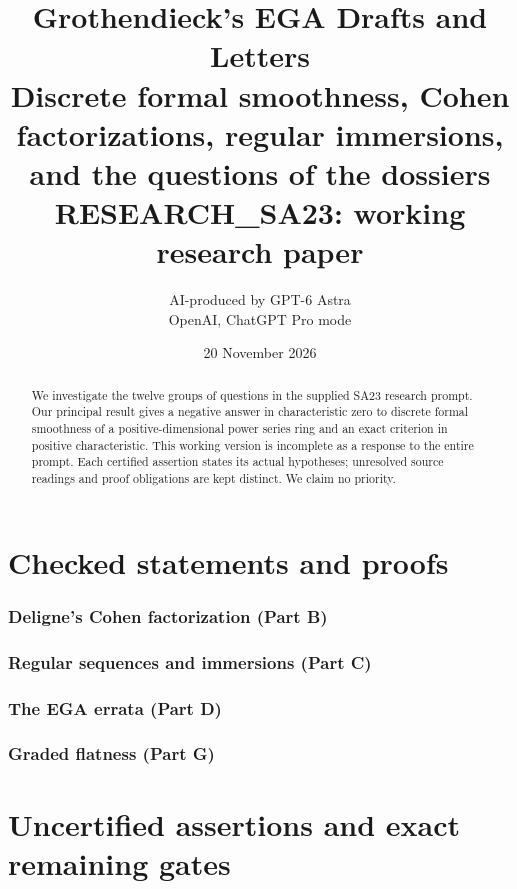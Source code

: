 \documentclass[11pt,a4paper]{article}
\title{\textbf{Grothendieck's EGA Drafts and Letters}\\[0.6em]
\large Discrete formal smoothness, Cohen factorizations, regular immersions,\\
and the questions of the dossiers\\[0.8em]\normalsize RESEARCH\_SA23: working research paper}
\author{AI-produced by GPT-6 Astra\\\small OpenAI, ChatGPT Pro mode}
\date{20 November 2026}
\numberwithin{equation}{section}
\theoremstyle{definition}
\theoremstyle{remark}
\begin{document}
\maketitle
\begin{abstract}
We investigate the twelve groups of questions in the supplied SA23
research prompt.  Our principal result gives a negative answer in
characteristic zero to discrete formal smoothness of a positive-dimensional
power series ring and an exact criterion in positive characteristic.
This working version is incomplete as a response to the entire prompt.
Each certified assertion states its actual hypotheses; unresolved source
readings and proof obligations are kept distinct.  We claim no priority.
\end{abstract}
\tableofcontents
\clearpage
\part{Checked statements and proofs}


\section{Deligne's Cohen factorization (Part B)}
\section{Regular sequences and immersions (Part C)}
\section{The EGA errata (Part D)}
\section{Graded flatness (Part G)}
\clearpage
\part{Uncertified assertions and exact remaining gates}
\clearpage


\end{document}
